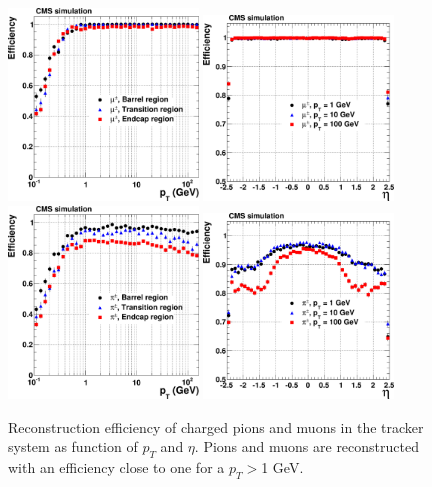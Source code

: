 \begin{figure}[!Hhtbp]
  \begin{center}
    \includegraphics[width=0.45\textwidth]{figs/eff_muon_vs_pt.png}
    \includegraphics[width=0.45\textwidth]{figs/eff_muon_vs_eta.png}
    \includegraphics[width=0.45\textwidth]{figs/eff_pion_vs_pt.png}
    \includegraphics[width=0.45\textwidth]{figs/eff_pion_vs_eta.png}
    \caption{Reconstruction efficiency of charged pions and muons in the tracker system as function of $p_{T}$ and $\eta$. Pions and muons are reconstructed with an efficiency close to one for a $p_{T}>$1 GeV. }
    \label{fig:TrackerEff}
  \end{center}
\end{figure}

